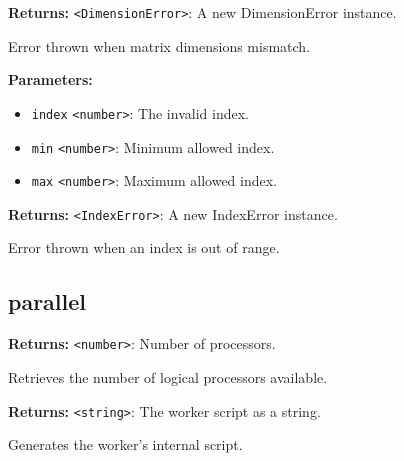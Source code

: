 \documentclass[12pt,a4paper]{article}
\begin{document}
\noindent \textbf{Returns:} \texttt{<DimensionError>}: A new DimensionError instance.

\noindent Error thrown when matrix dimensions mismatch.

\vspace{5mm}
\noindent {}


\noindent \textbf{Parameters:}
\begin{itemize}
  \item \texttt{index} \texttt{<number>}: The invalid index.
  \item \texttt{min} \texttt{<number>}: Minimum allowed index.
  \item \texttt{max} \texttt{<number>}: Maximum allowed index.
\end{itemize}

\noindent \textbf{Returns:} \texttt{<IndexError>}: A new IndexError instance.

\noindent Error thrown when an index is out of range.


\subsection{parallel}
\vspace{5mm}
\noindent {}


\noindent \textbf{Returns:} \texttt{<number>}: Number of processors.

\noindent Retrieves the number of logical processors available.

\vspace{5mm}
\noindent {}


\noindent \textbf{Returns:} \texttt{<string>}: The worker script as a string.

\noindent Generates the worker's internal script.

\vspace{5mm}
\noindent {}
\end{document}
